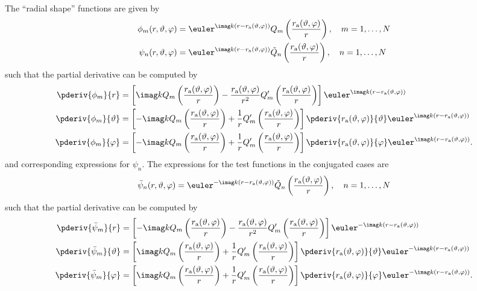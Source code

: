 The ``radial shape'' functions are given by
\begin{align*}
	\phi_m(r,\vartheta,\varphi) &= \euler^{\imag k (r-r_{\mathrm{a}}(\vartheta,\varphi))}Q_m\left(\frac{r_{\mathrm{a}}(\vartheta,\varphi)}{r}\right),\quad m = 1,\dots,N\\
	\psi_n(r,\vartheta,\varphi) &= \euler^{\imag k (r-r_{\mathrm{a}}(\vartheta,\varphi))}\tilde{Q}_n\left(\frac{r_{\mathrm{a}}(\vartheta,\varphi)}{r}\right),\quad n = 1,\dots,N
\end{align*}
such that the partial derivative can be computed by
\begin{align*}
	\pderiv{\phi_m}{r} &= \left[\imag kQ_m\left(\frac{r_{\mathrm{a}}(\vartheta,\varphi)}{r}\right) - \frac{r_{\mathrm{a}}(\vartheta,\varphi)}{r^2}Q_m'\left(\frac{r_{\mathrm{a}}(\vartheta,\varphi)}{r}\right)\right]\euler^{\imag k (r-r_{\mathrm{a}}(\vartheta,\varphi))}\\
	\pderiv{\phi_m}{\vartheta} &= \left[-\imag kQ_m\left(\frac{r_{\mathrm{a}}(\vartheta,\varphi)}{r}\right) + \frac{1}{r}Q_m'\left(\frac{r_{\mathrm{a}}(\vartheta,\varphi)}{r}\right)\right]\pderiv{r_{\mathrm{a}}(\vartheta,\varphi)}{\vartheta}\euler^{\imag k (r-r_{\mathrm{a}}(\vartheta,\varphi))}\\
	\pderiv{\phi_m}{\varphi} &= \left[-\imag kQ_m\left(\frac{r_{\mathrm{a}}(\vartheta,\varphi)}{r}\right) + \frac{1}{r}Q_m'\left(\frac{r_{\mathrm{a}}(\vartheta,\varphi)}{r}\right)\right]\pderiv{r_{\mathrm{a}}(\vartheta,\varphi)}{\varphi}\euler^{\imag k (r-r_{\mathrm{a}}(\vartheta,\varphi))}.
\end{align*}
and corresponding expressions for $\psi_n$. The expressions for the test functions in the conjugated cases are
\begin{equation*}
	\bar{\psi}_n(r,\vartheta,\varphi) = \euler^{-\imag k (r-r_{\mathrm{a}}(\vartheta,\varphi))}\tilde{Q}_n\left(\frac{r_{\mathrm{a}}(\vartheta,\varphi)}{r}\right),\quad n = 1,\dots,N
\end{equation*}
such that the partial derivative can be computed by
\begin{align*}
	\pderiv{\bar{\psi}_m}{r} &= \left[-\imag kQ_m\left(\frac{r_{\mathrm{a}}(\vartheta,\varphi)}{r}\right) - \frac{r_{\mathrm{a}}(\vartheta,\varphi)}{r^2}Q_m'\left(\frac{r_{\mathrm{a}}(\vartheta,\varphi)}{r}\right)\right]\euler^{-\imag k (r-r_{\mathrm{a}}(\vartheta,\varphi))}\\
	\pderiv{\bar{\psi}_m}{\vartheta} &= \left[\imag kQ_m\left(\frac{r_{\mathrm{a}}(\vartheta,\varphi)}{r}\right) + \frac{1}{r}Q_m'\left(\frac{r_{\mathrm{a}}(\vartheta,\varphi)}{r}\right)\right]\pderiv{r_{\mathrm{a}}(\vartheta,\varphi)}{\vartheta}\euler^{-\imag k (r-r_{\mathrm{a}}(\vartheta,\varphi))}\\
	\pderiv{\bar{\psi}_m}{\varphi} &= \left[\imag kQ_m\left(\frac{r_{\mathrm{a}}(\vartheta,\varphi)}{r}\right) + \frac{1}{r}Q_m'\left(\frac{r_{\mathrm{a}}(\vartheta,\varphi)}{r}\right)\right]\pderiv{r_{\mathrm{a}}(\vartheta,\varphi)}{\varphi}\euler^{-\imag k (r-r_{\mathrm{a}}(\vartheta,\varphi))}.
\end{align*}
